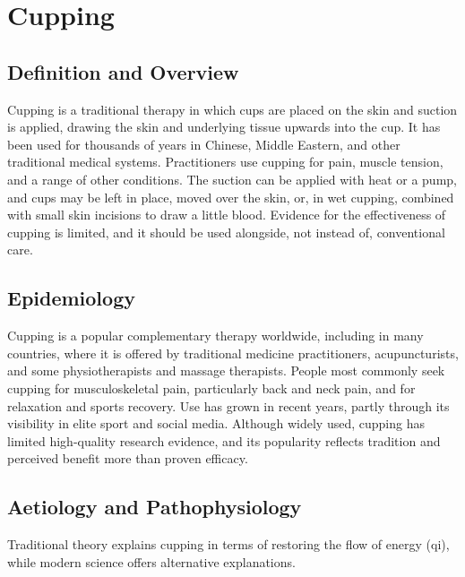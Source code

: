 \chapter{Cupping}

\section*{Definition and Overview}
Cupping is a traditional therapy in which cups are placed on the skin and suction is applied, drawing the skin and underlying tissue upwards into the cup. It has been used for thousands of years in Chinese, Middle Eastern, and other traditional medical systems. Practitioners use cupping for pain, muscle tension, and a range of other conditions. The suction can be applied with heat or a pump, and cups may be left in place, moved over the skin, or, in wet cupping, combined with small skin incisions to draw a little blood. Evidence for the effectiveness of cupping is limited, and it should be used alongside, not instead of, conventional care.

\section*{Epidemiology}
Cupping is a popular complementary therapy worldwide, including in many countries, where it is offered by traditional medicine practitioners, acupuncturists, and some physiotherapists and massage therapists. People most commonly seek cupping for musculoskeletal pain, particularly back and neck pain, and for relaxation and sports recovery. Use has grown in recent years, partly through its visibility in elite sport and social media. Although widely used, cupping has limited high-quality research evidence, and its popularity reflects tradition and perceived benefit more than proven efficacy.

\section*{Aetiology and Pathophysiology}
Traditional theory explains cupping in terms of restoring the flow of energy (qi), while modern science offers alternative explanations.


